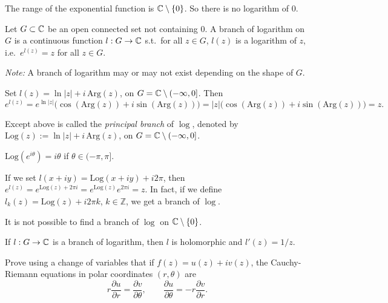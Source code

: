 \documentclass[11pt]{article}
\begin{document}
The range of the exponential function is ${\mathbb{C}}\setminus\{0\}$. So there is no logarithm of $0$. 

\begin{definition}
Let $G \subset {\mathbb{C}}$ be an open connected set not containing $0$. A branch of logarithm on $G$ is a continuous function $l: G \to {\mathbb{C}}$ s.t.\ for all $z \in G$, $l(z)$ is a logarithm of $z$, i.e.\ $e^{l(z)} = z$ for all $z \in G$.

\emph{Note:} A branch of logarithm may or may not exist depending on the shape of $G$.
\end{definition}

\begin{example}
Set $l(z) = \ln|z| + i\,\mathrm{Arg}(z)$, on $G = {\mathbb{C}}\setminus(-\infty,0]$. Then
\[
e^{l(z)} = e^{\ln|z|}\big(\cos(\mathrm{Arg}(z)) + i\sin(\mathrm{Arg}(z))\big) = |z|\big(\cos(\mathrm{Arg}(z)) + i\sin(\mathrm{Arg}(z))\big) = z.
\]
\end{example}

\begin{definition}
Except above is called the \emph{principal branch} of $\log$, denoted by $\mathrm{Log}(z) := \ln|z| + i\,\mathrm{Arg}(z)$, on $G = {\mathbb{C}}\setminus(-\infty,0]$.
\end{definition}

\begin{example}
$\mathrm{Log}(e^{i\theta}) = i\theta$ if $\theta \in (-\pi,\pi]$.
\end{example}

\begin{remark}
If we set $l(x+iy) = \mathrm{Log}(x+iy) + i2\pi$, then $e^{l(z)} = e^{\mathrm{Log}(z)+2\pi i} = e^{\mathrm{Log}(z)}e^{2\pi i} = z$.
In fact, if we define $l_k(z) = \mathrm{Log}(z) + i2\pi k$, $k \in \mathbb{Z}$, we get a branch of $\log$.
\end{remark}

\begin{remark}
It is not possible to find a branch of $\log$ on ${\mathbb{C}}\setminus\{0\}$.
\end{remark}

\begin{theorem}
If $l: G \to {\mathbb{C}}$ is a branch of logarithm, then $l$ is holomorphic and $l'(z) = 1/z$.
\end{theorem}

\begin{exercise}
    Prove using a change of variables that if $f(z) = u(z)+iv(z)$, the Cauchy-Riemann equations in polar coordinates $(r,\theta)$ are
    \[
    r\frac{\partial u}{\partial r} = \frac{\partial v}{\partial \theta}, \qquad \frac{\partial u}{\partial \theta} = -r\frac{\partial v}{\partial r}.
    \]
\end{exercise}
\end{document}
